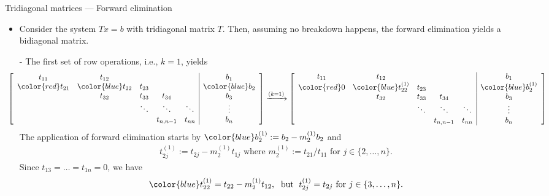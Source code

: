 \documentclass[t,usepdftitle=false]{beamer}
\begin{document}
\begin{frame}{Tridiagonal matrices --- Forward elimination}
\begin{itemize}
\item Consider the system $Tx=b$ with tridiagonal matrix $T$. Then, assuming no breakdown happens, the forward elimination yields a bidiagonal matrix.
\item[-] The first set of row operations, i.e., $k=1$, yields
\small
\begin{align*}
\hspace{-.55cm}
\left[\begin{array}{ccccc|c}
             t_{11} & t_{12}               &        &           &        & b_1              \\
{\color{red}t_{21}} & {\color{blue}t_{22}} & t_{23} &           &        & {\color{blue}b_2}\\
                    & t_{32}               & t_{33} & t_{34}    &        & b_3              \\ 
                    &                      & \ddots & \ddots    & \ddots & \vdots           \\
                    &                      &        & t_{n,n-1} & t_{nn} & b_n
\end{array}\right]
\xrightarrow{(k=1)}
\left[\begin{array}{ccccc|c}
t_{11}         & t_{12}                     &        &        &           & b_1                     \\
{\color{red}0} & {\color{blue}t_{22}^{(1)}} & t_{23} &        &           & {\color{blue}b_2^{(1)}} \\
               & t_{32}                     & t_{33} & t_{34} &           & b_3                     \\
               &                            & \ddots & \ddots & \ddots    & \vdots                  \\
               &                            &        & t_{n,n-1} & t_{nn} & b_n 
\end{array}\right]
\end{align*}\normalsize
The application of forward elimination starts by
${\color{blue}b_{2}^{(1)}}:=b_2-m^{(1)}_{2}b_2$
and
\begin{align*}
t_{2j}^{(1)}\!:=t_{2j}\!-m_2^{(1)} t_{1j}
\text{ where } 
m_2^{(1)}\!:=t_{21}\!/t_{11}
\text{ for }
j\in\{2,\dots,n\}.
\end{align*}
Since $t_{13}=\dots=t_{1n}=0$, we have
\begin{align*}
{\color{blue}t_{22}^{(1)}}=t_{22}-m_2^{(1)}t_{12},
\;\text{ but }\;
t_{2j}^{(1)}=t_{2j}
\text{ for }j\in\{3,\dots,n\}.
\end{align*}
\end{itemize}
\end{frame}
\end{document}
